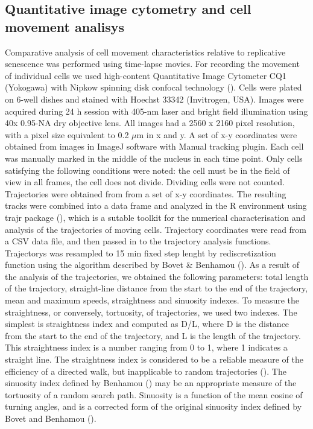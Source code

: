 \documentclass[alpha-refs]{wiley-article}
\begin{document}
\subsection{Quantitative image cytometry and cell movement analisys}

Comparative analysis of cell movement characteristics relative to replicative senescence was performed using time-lapse movies.
For recording the movement of individual cells we used high-content Quantitative Image Cytometer CQ1 (Yokogawa) with Nipkow spinning disk confocal technology (\cite{sakashita2015cq1}).
Cells were plated on 6-well dishes and stained with Hoechst 33342 (Invitrogen, USA).
Images were acquired during 24 h session with 405-nm laser and bright field illumination using 40x 0.95-NA dry objective lens.
All images had a 2560 x 2160 pixel resolution, with a pixel size equivalent to 0.2 $\mu$m in x and y.
A set of x-y coordinates were obtained from images in ImageJ software with Manual tracking plugin.
Each cell was manually marked in the middle of the nucleus in each time point.
Only cells satisfying the following conditions were noted: the cell must be in the field of view in all frames, the cell does not divide.
Dividing cells were not counted.
Trajectories were obtained from from a set of x-y coordinates.
The resulting tracks were combined into a data frame and analyzed in the R environment using trajr package (\cite{mclean2018trajr}), which is a sutable toolkit for the numerical characterisation and analysis of the trajectories of moving cells.
Trajectory coordinates were read from a CSV data file, and then passed in to the trajectory analysis functions.
Trajectorys was resampled to 15 min fixed step lenght by rediscretization function using the algorithm described by Bovet \& Benhamou (\cite{bovet1988spatial}).
As a result of the analysis of the trajectories, we obtained the following parameters: total length of the trajectory, straight-line distance from the start to the end of the trajectory, mean and maximum speeds, straightness and sinuosity indexes.
To measure the straightness, or conversely, tortuosity, of trajectories, we used two indexes.
The simplest is straightness index and computed as D/L, where D is the distance from the start to the end of the trajectory, and L is the length of the trajectory.
This straightness index is a number ranging from 0 to 1, where 1 indicates a straight line.
The straightness index is considered to be a reliable measure of the efficiency of a directed walk, but inapplicable to random trajectories (\cite{benhamou2006detecting}).
The sinuosity index defined by Benhamou (\cite{benhamou2004reliably}) may be an appropriate measure of the tortuosity of a random search path.
Sinuosity is a function of the mean cosine of turning angles, and is a corrected form of the original sinuosity index defined by Bovet and Benhamou (\cite{bovet1988spatial}).
\end{document}
